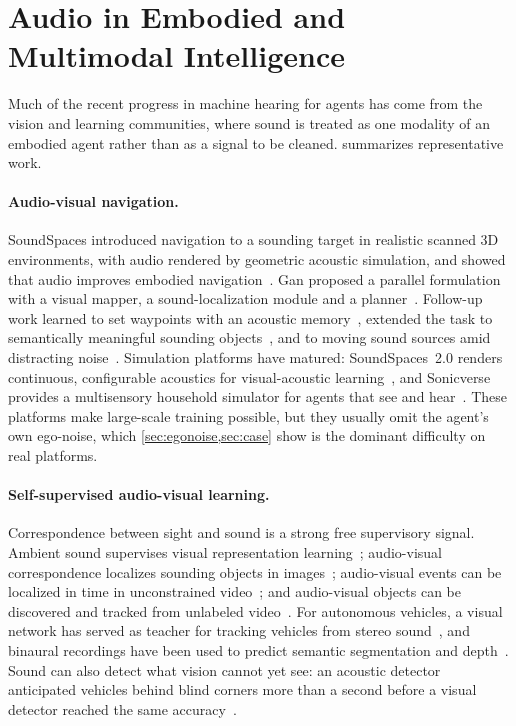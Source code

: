 \section{Audio in Embodied and Multimodal Intelligence}
\label{sec:embodied}

Much of the recent progress in machine hearing for agents has come from the vision and learning communities, where sound is treated as one modality of an embodied agent rather than as a signal to be cleaned.
 summarizes representative work.

\paragraph{Audio-visual navigation.}
SoundSpaces introduced navigation to a sounding target in realistic scanned 3D environments, with audio rendered by geometric acoustic simulation, and showed that audio improves embodied navigation~\cite{chen2020soundspaces}.
Gan \etal proposed a parallel formulation with a visual mapper, a sound-localization module and a planner~\cite{gan2020look}.
Follow-up work learned to set waypoints with an acoustic memory~\cite{chen2021waypoints}, extended the task to semantically meaningful sounding objects~\cite{chen2021semantic}, and to moving sound sources amid distracting noise~\cite{younes2023catch}.
Simulation platforms have matured: SoundSpaces~2.0 renders continuous, configurable acoustics for visual-acoustic learning~\cite{chen2022soundspaces2}, and Sonicverse provides a multisensory household simulator for agents that see and hear~\cite{gao2023sonicverse}.
These platforms make large-scale training possible, but they usually omit the agent's own ego-noise, which \cref{sec:egonoise,sec:case} show is the dominant difficulty on real platforms.

\paragraph{Self-supervised audio-visual learning.}
Correspondence between sight and sound is a strong free supervisory signal.
Ambient sound supervises visual representation learning~\cite{owens2016ambient}; audio-visual correspondence localizes sounding objects in images~\cite{arandjelovic2018objects,senocak2018localize}; audio-visual events can be localized in time in unconstrained video~\cite{tian2018ave}; and audio-visual objects can be discovered and tracked from unlabeled video~\cite{afouras2020avobjects}.
For autonomous vehicles, a visual network has served as teacher for tracking vehicles from stereo sound~\cite{gan2019stereo}, and binaural recordings have been used to predict semantic segmentation and depth~\cite{vasudevan2020binaural}.
Sound can also detect what vision cannot yet see: an acoustic detector anticipated vehicles behind blind corners more than a second before a visual detector reached the same accuracy~\cite{schulz2021hearing}.

